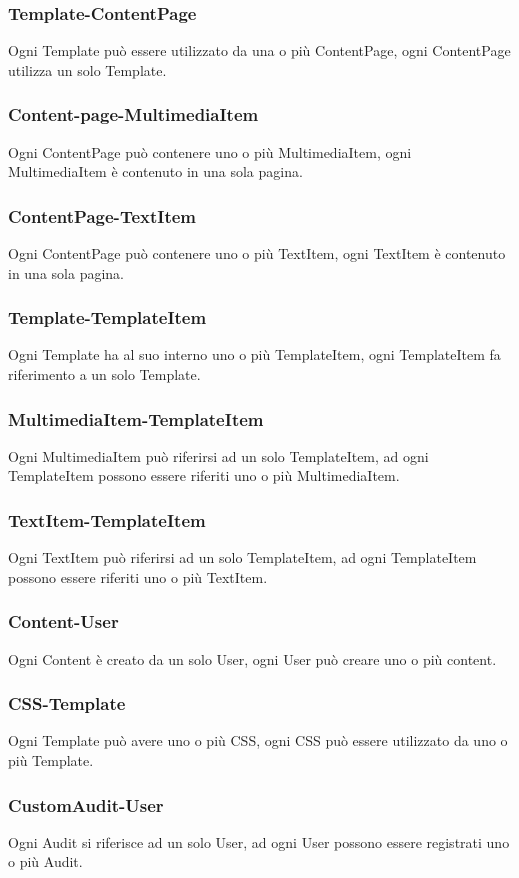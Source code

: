 \subsubsection{Template-ContentPage}
Ogni Template può essere utilizzato da una o più ContentPage, ogni ContentPage utilizza un solo Template.
\subsubsection{Content-page-MultimediaItem}
Ogni ContentPage può contenere uno o più MultimediaItem, ogni MultimediaItem è contenuto in una sola pagina.
\subsubsection{ContentPage-TextItem}
Ogni ContentPage può contenere uno o più TextItem, ogni TextItem è contenuto in una sola pagina.
\subsubsection{Template-TemplateItem}
Ogni Template ha al suo interno uno o più TemplateItem, ogni TemplateItem fa riferimento a un solo Template.
\subsubsection{MultimediaItem-TemplateItem}
Ogni MultimediaItem può riferirsi ad un solo TemplateItem, ad ogni TemplateItem possono essere riferiti uno o più MultimediaItem.
\subsubsection{TextItem-TemplateItem}
Ogni TextItem può riferirsi ad un solo TemplateItem, ad ogni TemplateItem possono essere riferiti uno o più TextItem.
\subsubsection{Content-User}
Ogni Content è creato da un solo User, ogni User può creare uno o più content.
\subsubsection{CSS-Template}
Ogni Template può avere uno o più CSS, ogni CSS può essere utilizzato da uno o più Template.
\subsubsection{CustomAudit-User}
Ogni Audit si riferisce ad un solo User, ad ogni User possono essere registrati uno o più Audit.


